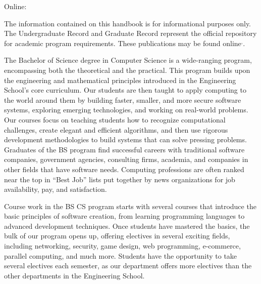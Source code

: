 \noindent Online: \bscsURL


The information contained on this handbook is for informational
purposes only. The Undergraduate Record and Graduate Record represent
the official repository for academic program requirements. These
publications may be found online$^,$.




The Bachelor of Science degree in Computer Science is a wide-ranging
program, encompassing both the theoretical and the practical.  This
program builds upon the engineering and mathematical principles
introduced in the Engineering School's core curriculum.  Our students
are then taught to apply computing to the world around them by building
faster, smaller, and more secure software systems, exploring emerging
technologies, and working on real-world problems.  Our courses focus
on teaching students how to recognize computational challenges, create
elegant and efficient algorithms, and then use rigorous development
methodologies to build systems that can solve pressing
problems. Graduates of the BS program find successful careers with
traditional software companies, government agencies, consulting firms,
academia, and companies in other fields that have software needs.
Computing professions are often ranked near the top in ``Best Job''
lists put together by news organizations for job availability, pay,
and satisfaction.

Course work in the BS CS program starts with several courses that
introduce the basic principles of software creation, from learning
programming languages to advanced development techniques.  Once
students have mastered the basics, the bulk of our program opens up,
offering electives in several exciting fields, including networking,
security, game design, web programming, e-commerce, parallel
computing, and much more.  Students have the opportunity to take
several electives each semester, as our department offers more
electives than the other departments in the Engineering School. 



